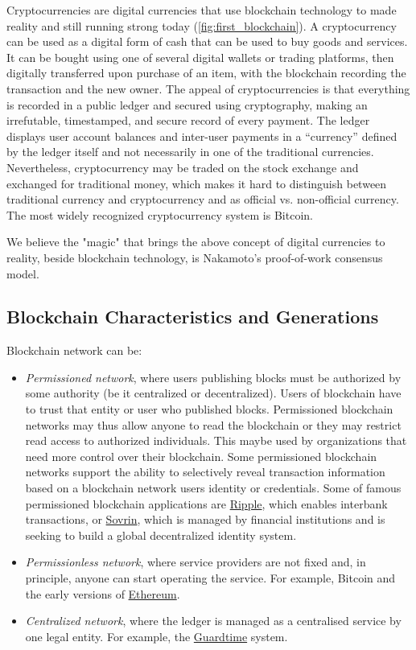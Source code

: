 Cryptocurrencies are digital currencies that use blockchain technology to made reality and still running strong today (\autoref{fig:first_blockchain}).
A cryptocurrency can be used as a digital form of cash that can be used to buy goods and services.
It can be bought using one of several digital wallets or trading platforms, then digitally transferred upon purchase of an item, with the blockchain recording the transaction and the new owner.
The appeal of cryptocurrencies is that everything is recorded in a public ledger and secured using cryptography, making an irrefutable, timestamped, and secure record of every payment.
The ledger displays user account balances and inter-user payments in a “currency” defined by the ledger itself and not necessarily in one of the traditional currencies.
Nevertheless, cryptocurrency may be traded on the stock exchange and exchanged for traditional money, which makes it hard to distinguish between traditional currency and cryptocurrency and as official vs. non-official currency.
The most widely recognized cryptocurrency system is Bitcoin.

We believe the "magic" that brings the above concept of digital currencies to reality, beside blockchain technology, is Nakamoto's proof-of-work consensus model.  

\subsection{Blockchain Characteristics and Generations}

Blockchain network can be:
\begin{itemize}
  \item \emph{Permissioned network}, where users publishing blocks must be authorized by some authority (be it centralized or decentralized).
        Users of blockchain have to trust that entity or user who published blocks.
        Permissioned blockchain networks may thus allow anyone to read the blockchain or they may restrict read access to authorized individuals. This maybe used by organizations that need more control over their blockchain.
        Some permissioned blockchain networks support the ability to selectively reveal transaction information based on a blockchain network users identity or credentials.
        Some of famous permissioned blockchain applications are \href{https://ripple.com/}{Ripple}, which enables interbank transactions, or \href{https://sovrin.org/}{Sovrin}, which is managed by financial institutions and is seeking to build a global decentralized identity system.

  \item \emph{Permissionless network}, where service providers are not fixed and, in principle, anyone can start operating the service.
        For example, Bitcoin and the early versions of \href{https://ethereumclassic.org/}{Ethereum}.

  \item \emph{Centralized network}, where the ledger is managed as a centralised service by one legal	entity. For example, the \href{https://guardtime.com/}{Guardtime} system.
\end{itemize}

